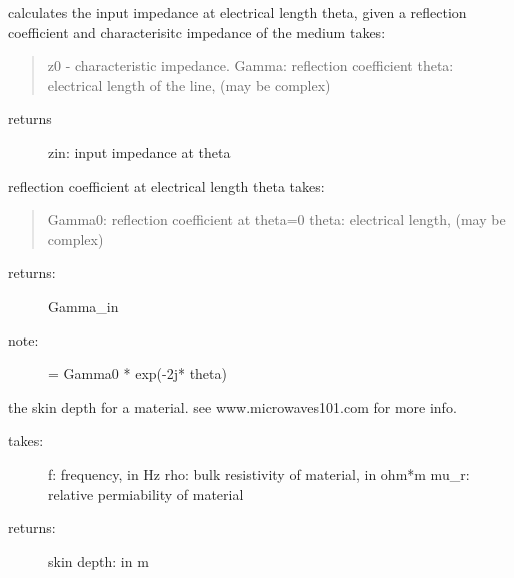 \documentclass[letterpaper,10pt,english]{sphinxmanual}
\begin{document}
\begin{fulllineitems}
\label{api/mwavepy:mwavepy.tlineFunctions.reflection_coefficient_2_input_impedance_at_theta}
calculates the input impedance at electrical length theta, given a
reflection coefficient and characterisitc impedance of the medium
takes:
\begin{quote}

z0 - characteristic impedance. 
Gamma: reflection coefficient
theta: electrical length of the line, (may be complex)
\end{quote}
\begin{description}
\item[{returns }] \leavevmode
zin: input impedance at theta

\end{description}

\end{fulllineitems}


\begin{fulllineitems}
\label{api/mwavepy:mwavepy.tlineFunctions.reflection_coefficient_at_theta}
reflection coefficient at electrical length theta
takes:
\begin{quote}

Gamma0: reflection coefficient at theta=0
theta: electrical length, (may be complex)
\end{quote}
\begin{description}
\item[{returns:}] \leavevmode
Gamma\_in

\item[{note: }] \leavevmode
= Gamma0 * exp(-2j* theta)

\end{description}

\end{fulllineitems}


\begin{fulllineitems}
\label{api/mwavepy:mwavepy.tlineFunctions.skin_depth}
the skin depth for a material. see www.microwaves101.com for more info.
\begin{description}
\item[{takes:}] \leavevmode
f: frequency, in Hz
rho: bulk resistivity of material, in ohm*m
mu\_r: relative permiability of material

\item[{returns:}] \leavevmode
skin depth: in m

\end{description}

\end{fulllineitems}
\end{document}
